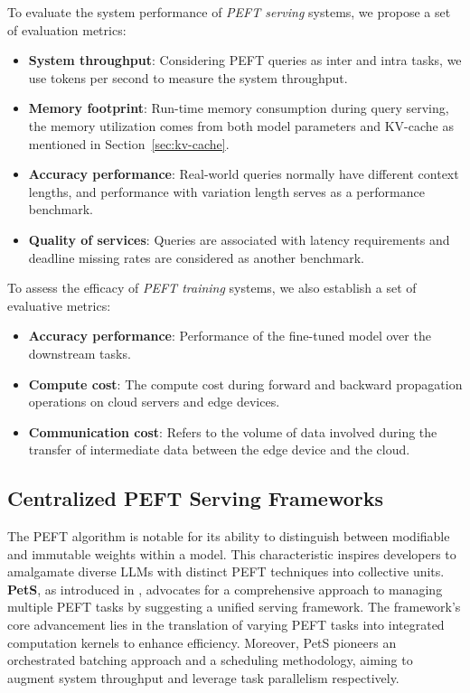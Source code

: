 To evaluate the system performance of \textit{PEFT serving} systems, we propose a set of evaluation metrics:
\begin{itemize}
    \item \textbf{System throughput}: Considering PEFT queries as inter and intra tasks, we use tokens per second to measure the system throughput.
    \item \textbf{Memory footprint}: Run-time memory consumption during query serving, the memory utilization comes from both model parameters and KV-cache as mentioned in Section~\ref{sec:kv-cache}.
    \item \textbf{Accuracy performance}: Real-world queries normally have different context lengths, and performance with variation length serves as a performance benchmark.
    \item \textbf{Quality of services}: Queries are associated with latency requirements and deadline missing rates are considered as another benchmark.
\end{itemize}

To assess the efficacy of \textit{PEFT training} systems, we also establish a set of evaluative metrics:
\begin{itemize}
   \item \textbf{Accuracy performance}: Performance of the fine-tuned model over the downstream tasks.
   \item \textbf{Compute cost}: The compute cost during forward and backward propagation operations on cloud servers and edge devices.
   \item \textbf{Communication cost}: Refers to the volume of data involved during the transfer of intermediate data between the edge device and the cloud.
\end{itemize}


\subsection{Centralized PEFT Serving Frameworks}
\label{sec:PetS}
The PEFT algorithm is notable for its ability to distinguish between modifiable and immutable weights within a model. This characteristic inspires developers to amalgamate diverse LLMs with distinct PEFT techniques into collective units. \textbf{PetS}, as introduced in \cite{pets}, advocates for a comprehensive approach to managing multiple PEFT tasks by suggesting a unified serving framework. The framework's core advancement lies in the translation of varying PEFT tasks into integrated computation kernels to enhance efficiency. Moreover, PetS pioneers an orchestrated batching approach and a scheduling methodology, aiming to augment system throughput and leverage task parallelism respectively.

